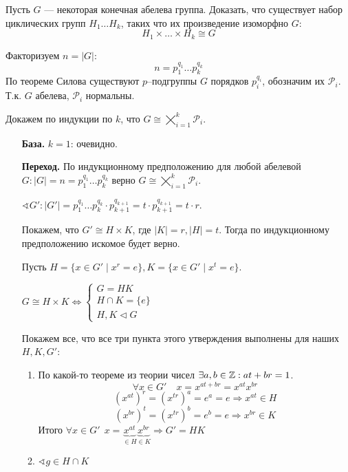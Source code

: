 \begin{exercise}
    Пусть \(G\) --- некоторая конечная абелева группа. Доказать, что существует набор циклических групп \(H_1 \dots H_k\), таких что их произведение изоморфно \(G\):
    \[H_1 \times \dots \times H_k \cong G\]
\end{exercise}
\begin{solution}
    Факторизуем \(n = |G|\):
    \[n = p_1^{q_1} \dots p_k^{q_k}\]
    По теореме Силова существуют \(p\)--подгруппы \(G\) порядков \(p_i^{q_i}\), обозначим их \(\mathcal{P}_i\). Т.к. \(G\) абелева, \(\mathcal{P}_i\) нормальны.

    Докажем по индукции по \(k\), что \(G \cong \bigtimes_{i = 1}^k \mathcal{P}_i\).

    \begin{itemize}
        \item [\textbf{База.}] \(k = 1\): очевидно.
        \item [\textbf{Переход.}] По индукционному предположению для любой абелевой \(G : |G| = n = p_1^{q_1} \dots p_k^{q_k}\) верно \(G \cong \bigtimes_{i = 1}^k \mathcal{P}_i\).

              \(\sphericalangle G' : |G'| = p_1^{q_1} \dots p_k^{q_k} \cdot p_{k+1}^{q_{k+1}} = t \cdot p_{k+1}^{q_{k+1}} = t \cdot r\).

              Покажем, что \(G' \cong H \times K\), где \(|K| = r, |H| = t\). Тогда по индукционному предположению искомое будет верно.

              Пусть \(H = \{x \in G' \mid x^r = e\}, K = \{x \in G' \mid x^t = e\}\).

              \begin{statement}
                  \(G \cong H \times K \Leftrightarrow
                  \begin{cases}
                      G = HK           \\
                      H \cap K = \{e\} \\
                      H, K \vartriangleleft G
                  \end{cases}\)
              \end{statement}
              Покажем все, что все три пункта этого утверждения выполнены для наших \(H, K, G'\):
              \begin{enumerate}
                  \item По какой-то теореме из теории чисел \(\exists a, b \in \mathbb{Z} : at + br = 1\).
                        \[\forall x \in G' \quad x = x^{at + br} = x^{at} x^{br}\]
                        \[(x^{at})^r = (x^{tr})^a = e^a = e \Rightarrow x^{at} \in H\]
                        \[(x^{br})^t = (x^{tr})^b = e^b = e \Rightarrow x^{br} \in K\]
                        Итого \(\forall x \in G' \ \ x = \underbrace{x^{at}}_{\in H} \underbrace{x^{br}}_{\in K} \Rightarrow G' = HK\)
                  \item \(\sphericalangle g \in H \cap K\)


\end{enumerate}
\end{itemize}
\end{solution}
